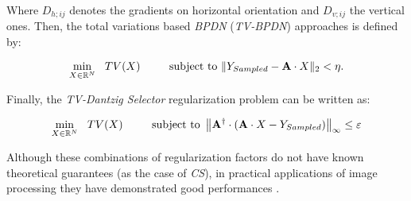 Where $D_{h;ij}$ denotes the gradients on horizontal orientation and $D_{v;ij}$ the vertical ones. Then, the total variations based \emph{BPDN} (\emph{TV-BPDN}) approaches is defined by: 

\begin{equation}
\min_{X \in \mathbb{R}^{N}} \ \ TV(X) \hspace{0.8cm}  \mbox{ subject to } \|Y_{Sampled} - \mathbf{A} \cdot X\|_2<{\eta} .
\label{eq:TV_reg_BPDN}
\end{equation}

Finally, the \emph{TV-Dantzig Selector} regularization problem can be written as:


\begin{equation}
\min_{X \in \R^{\spacedim}} \ \  TV(X)  \hspace{0.8cm}  \mbox{ subject to }  \left\| \sensing^\dagger \cdot (\sensing \cdot X - Y_{Sampled}) \right\| _{\infty} \leq \epsilon
\label{eq:TV_reg_Dantzig}
\end{equation}

Although these combinations of regularization factors do not have known theoretical guarantees (as the case of \emph{CS}), in practical applications of image processing they have demonstrated good performances \citep{Chambolle_2010_a}.





